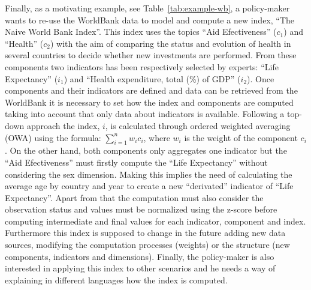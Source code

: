 \documentclass{llncs}
\begin{document}
Finally, as a motivating example, see Table~\ref{tab:example-wb}, a policy-maker wants to re-use the WorldBank data to model and compute a new index, ``The Naive World Bank Index''. This 
index uses the topics ``Aid Efectiveness'' ($c_1$) and ``Health'' ($c_2$) with the aim of comparing the status and evolution of health in several countries to decide whether new 
investments are performed. From these components two indicators has been respectively selected by experts: ``Life Expectancy'' ($i_1$) and ``Health expenditure, total (\%) of GDP'' ($i_2$). 
Once components and their indicators are defined and data can be retrieved from the WorldBank it is necessary to set how the index and components are computed 
taking into account that only data about indicators is available. Following a top-down approach the index, $i$, is calculated through ordered weighted averaging (OWA) using the 
formula: $\sum_{i=1}^n  w_i c_i$, where $w_i$ is the weight of the component $c_i$. On the other hand, both components only aggregates one indicator but the ``Aid Efectiveness'' 
must firstly compute the ``Life Expectancy'' without considering the sex dimension. Making this implies the need of calculating the average age by country and year to create 
a new ``derivated'' indicator of ``Life Expectancy''. Apart from that the computation must also consider the observation status and values must be normalized using the 
z-score before computing intermediate and final values for each indicator, component and index. Furthermore this index is supposed to change in the future 
adding new data sources, modifying the computation processes (weights) or the structure (new components, indicators and dimensions). Finally, the policy-maker 
is also interested in applying this index to other scenarios and he needs a way of explaining in different languages how the index is computed. 
\end{document}

